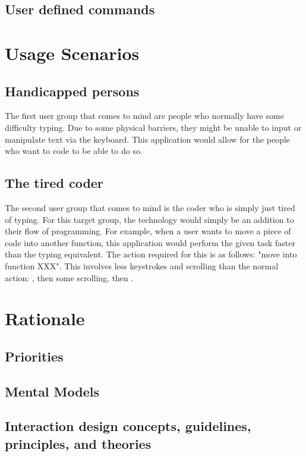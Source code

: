 \documentclass[11pt, oneside]{article}
\begin{document}
\subsection{User defined commands}




\section{Usage Scenarios}

\subsection{Handicapped persons}

The first user group that comes to mind are people who normally have some difficulty typing. Due to some physical barriers, they might be unable to input or manipulate text via the keyboard. This application would allow for the people who want to code to be able to do so. 

\subsection{The tired coder}

The second user group that comes to mind is the coder who is simply just tired of typing. For this target group, the technology would simply be an addition to their flow of programming. For example, when a user wants to move a piece of code into another function, this application would perform the given task faster than the typing equivalent. The action required for this is as follows:  "move into function XXX". This involves less keystrokes and scrolling than the normal action: , then some scrolling, then .

\section{Rationale}

\subsection{Priorities}
\subsection{Mental Models}
\subsection{Interaction design concepts, guidelines, principles, and theories}
\end{document}
